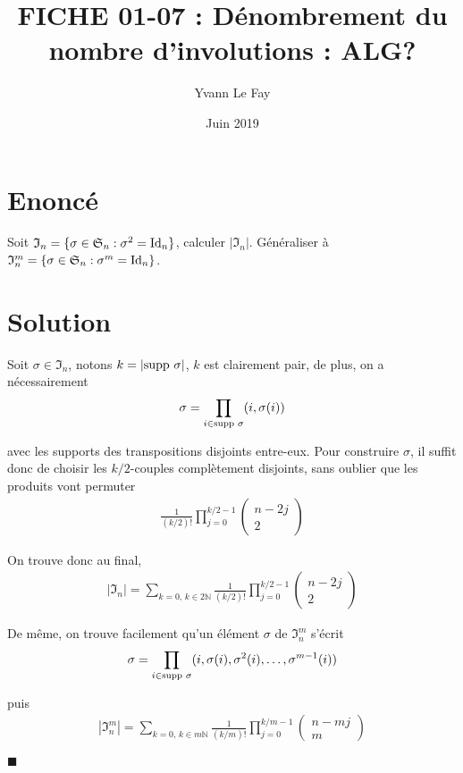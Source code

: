\documentclass{article}
\newcommand*{\QED}{\hfill\ensuremath{\blacksquare}}%
\begin{document}
\title{FICHE 01-07 : Dénombrement du nombre d'involutions : ALG?}
\author{Yvann Le Fay}
\date{Juin 2019}
\maketitle
\section*{Enoncé}
Soit $\mathfrak{I}_n = \{\sigma\in \mathfrak{S}_n : \sigma^2 = \textup{Id}_n\}$, calculer $|\mathfrak{I}_n|$. Généraliser à $\mathfrak{I}_n^m = \{\sigma \in\mathfrak{S}_n : \sigma^m = \textup{Id}_n\}$.
\section*{Solution}
Soit $\sigma\in\mathfrak{I}_n$, notons $k=|\textup{supp }\sigma|$, $k$ est clairement pair, de plus, on a nécessairement
\begin{align*}
\sigma = \prod_{i \in \textup{supp }\sigma}(i,\sigma(i))
\end{align*}

avec les supports des transpositions disjoints entre-eux. Pour construire $\sigma$, il suffit donc de choisir les $k/2$-couples complètement disjoints, sans oublier que les produits vont permuter
\begin{align*}
\frac{1}{(k/2)!}\prod_{j=0}^{k/2-1}\begin{pmatrix}
n-2j\\2
\end{pmatrix}
\end{align*}

On trouve donc au final,
\begin{align*}
|\mathfrak{I}_n| = \sum_{k=0, \, k \in 2\mathbb{N}}\frac{1}{(k/2)!}\prod_{j=0}^{k/2-1}\begin{pmatrix}n-2j\\2\end{pmatrix}
\end{align*}


De même, on trouve facilement qu'un élément $\sigma$ de $\mathfrak{I}_n^m$ s'écrit
\begin{align*}
\sigma = \prod_{i\in \textup{supp }\sigma}(i,\sigma(i), \sigma^2(i),\ldots,\sigma^{m-1}(i))
\end{align*}

puis
\begin{align*}
|\mathfrak{I}_n^m|= \sum_{k=0,\, k\in m\mathbb{N}}\frac{1}{(k/m)!}\prod_{j=0}^{k/m-1}\begin{pmatrix}n-mj\\m\end{pmatrix}
\end{align*}

\QED
\end{document}
